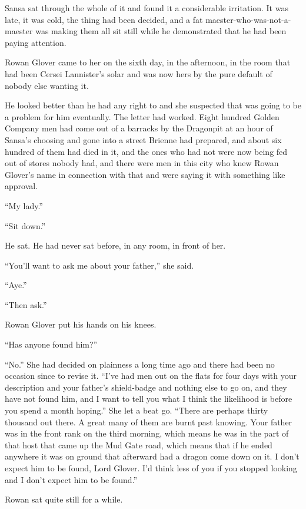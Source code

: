Sansa sat through the whole of it and found it a considerable irritation. It was late, it was cold, the thing had been decided, and a fat maester-who-was-not-a-maester was making them all sit still while he demonstrated that he had been paying attention.

\sceneBreak

Rowan Glover came to her on the sixth day, in the afternoon, in the room that had been Cersei Lannister’s solar and was now hers by the pure default of nobody else wanting it.

He looked better than he had any right to and she suspected that was going to be a problem for him eventually. The letter had worked. Eight hundred Golden Company men had come out of a barracks by the Dragonpit at an hour of Sansa’s choosing and gone into a street Brienne had prepared, and about six hundred of them had died in it, and the ones who had not were now being fed out of stores nobody had, and there were men in this city who knew Rowan Glover’s name in connection with that and were saying it with something like approval.

“My lady.”

“Sit down.”

He sat. He had never sat before, in any room, in front of her.

“You’ll want to ask me about your father,” she said.

“Aye.”

“Then ask.”

Rowan Glover put his hands on his knees.

“Has anyone found him?”

“No.” She had decided on plainness a long time ago and there had been no occasion since to revise it. “I’ve had men out on the flats for four days with your description and your father’s shield-badge and nothing else to go on, and they have not found him, and I want to tell you what I think the likelihood is before you spend a month hoping.” She let a beat go. “There are perhaps thirty thousand out there. A great many of them are burnt past knowing. Your father was in the front rank on the third morning, which means he was in the part of that host that came up the Mud Gate road, which means that if he ended anywhere it was on ground that afterward had a dragon come down on it. I don’t expect him to be found, Lord Glover. I’d think less of you if you stopped looking and I don’t expect him to be found.”

Rowan sat quite still for a while.

